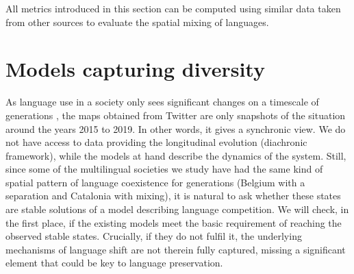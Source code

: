 \documentclass[../thesis.tex]{subfiles}
\begin{document}
All metrics introduced in this section can be computed using similar data taken from
other sources to evaluate the spatial mixing of languages.



\section{Models capturing diversity}
\label{sec:multiling_models}
As language use in a society only sees significant changes on a timescale of generations
\cite{LabovSociolinguisticPatterns1973}, the maps obtained from Twitter are only
snapshots of the situation around the years 2015 to 2019. In other words, it gives a
synchronic view. We do not have access to data providing the longitudinal evolution
(diachronic framework), while the models at hand describe the dynamics of the system.
Still, since some of the multilingual societies we study have had the same kind of
spatial pattern of language coexistence for generations (Belgium with a separation and
Catalonia with mixing), it is natural to ask whether these states are stable solutions
of a model describing language competition. We will check, in the first place, if the
existing models meet the basic requirement of reaching the observed stable states.
Crucially, if they do not fulfil it, the underlying mechanisms of language shift are not
therein fully captured, missing a significant element that could be key to language
preservation.
\end{document}
